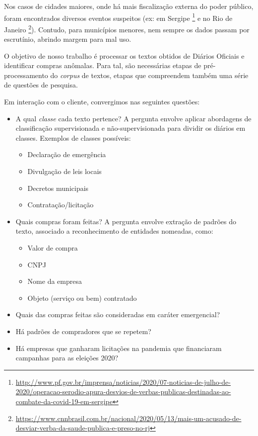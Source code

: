 \documentclass[10pt, a4paper]{article}
\begin{document}
Nos casos de cidades maiores, onde há mais fiscalização externa do poder público, foram encontrados diversos eventos suspeitos (ex: em Sergipe \footnote{\url{http://www.pf.gov.br/imprensa/noticias/2020/07-noticias-de-julho-de-2020/operacao-serodio-apura-desvios-de-verbas-publicas-destinadas-ao-combate-da-covid-19-em-sergipe}} e no Rio de Janeiro \footnote{\url{https://www.cnnbrasil.com.br/nacional/2020/05/13/mais-um-acusado-de-desviar-verba-da-saude-publica-e-preso-no-rj}}). Contudo, para municípios menores, nem sempre os dados passam por escrutínio, abrindo margem para mal uso. 

O objetivo de nosso trabalho é processar os textos obtidos de Diários Oficiais e identificar compras anômalas. Para tal, são necessárias etapas de pré-processamento do \textit{corpus} de textos, etapas que compreendem também uma série de questões de pesquisa. 

Em interação com o cliente, convergimos nas seguintes questões: 

\begin{itemize}
    \item A qual \textit{classe} cada texto pertence? A pergunta envolve aplicar abordagens de classificação supervisionada e não-supervisionada para dividir os diários em classes. Exemplos de classes possíveis:
    \begin{itemize}
        \item Declaração de emergência
        \item Divulgação de leis locais
        \item Decretos municipais
        \item Contratação/licitação
    \end{itemize}
    
    \item Quais compras foram feitas? A pergunta envolve extração de padrões do texto, associado a reconhecimento de entidades nomeadas, como:
        \begin{itemize}
        \item Valor de compra
        \item CNPJ
        \item Nome da empresa
        \item Objeto (serviço ou bem) contratado
     \end{itemize}
     
    \item Quais das compras feitas são consideradas em caráter emergencial?
    
    \item Há padrões de compradores que se repetem? 
    
    \item Há empresas que ganharam licitações na pandemia que financiaram campanhas para as eleições 2020?

\end{itemize}
\end{document}
